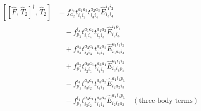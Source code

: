 \documentclass[11pt]{article}
\begin{document}
\begin{align}
\left[\left[\hat{F},\, \hat{T}_{2}\right]^{\dagger},\, \hat{T}_{2}\right] &= f^{a_{1}}_{a_{2}} t^{a_{1}a_{3}}_{i_{1}i_{2}} t^{a_{2}a_{3}}_{i_{3}i_{4}} \hat{E}^{i_{1}i_{2}}_{i_{3}i_{4}} \\
&\quad - f^{i_{4}}_{p_{1}} t^{a_{1}a_{2}}_{i_{1}i_{4}} t^{a_{1}a_{2}}_{i_{2}i_{3}} \hat{E}^{i_{1}p_{1}}_{i_{2}i_{3}} \\
&\quad + f^{a_{3}}_{a_{4}} t^{a_{3}a_{1}}_{i_{4}i_{3}} t^{a_{4}a_{2}}_{i_{2}i_{1}} \hat{E}^{a_{1}i_{1}i_{2}}_{i_{3}a_{2}i_{4}} \\
&\quad + f^{a_{2}}_{p_{1}} t^{a_{2}a_{3}}_{i_{2}i_{1}} t^{a_{3}a_{1}}_{i_{4}i_{3}} \hat{E}^{a_{1}i_{1}i_{2}}_{i_{3}i_{4}p_{1}} \\
&\quad - f^{i_{4}}_{p_{1}} t^{a_{3}a_{1}}_{i_{3}i_{2}} t^{a_{3}a_{2}}_{i_{4}i_{1}} \hat{E}^{a_{1}i_{1}p_{1}}_{i_{2}a_{2}i_{3}} \\
&\quad - f^{i_{4}}_{p_{1}} t^{a_{3}a_{1}}_{i_{3}i_{2}} t^{a_{3}a_{2}}_{i_{1}i_{4}} \hat{E}^{a_{1}i_{1}p_{1}}_{i_{2}i_{3}a_{2}}\quad (\text{three-body terms})
\end{align}
\end{document}
